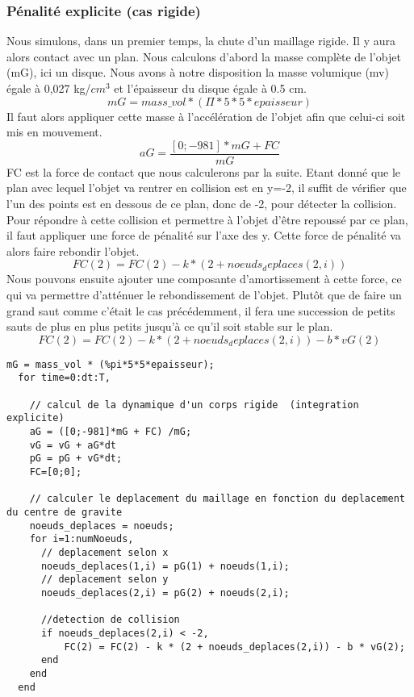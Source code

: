 \documentclass[a4paper,11pt]{article}
\begin{document}
\subsubsection{Pénalité explicite (cas rigide)}
Nous simulons, dans un premier temps, la chute d'un maillage rigide. Il y aura alors contact avec un plan.
Nous calculons d'abord la masse complète de l'objet (mG), ici un disque. Nous avons à notre disposition la 
masse volumique (mv) égale à 0,027 kg/$cm^3$ et l'épaisseur du disque égale à 0.5 cm.
\begin{equation}
  mG = mass\_vol * (\Pi*5*5*epaisseur)
\end{equation}
Il faut alors appliquer cette masse à l’accélération de l'objet afin que celui-ci soit mis en mouvement.
\begin{equation}
  aG = \frac{[0;-981]*mG + FC}{mG}
\end{equation}
FC est la force de contact que nous calculerons par la suite.
Etant donné que le plan avec lequel l'objet va rentrer en collision est en y=-2, il suffit de vérifier
que l'un des points est en dessous de ce plan, donc de -2, pour détecter la collision. Pour répondre à
cette collision et permettre à l'objet d'être repoussé par ce plan, il faut appliquer une force de pénalité
sur l'axe des y. Cette force de pénalité va alors faire rebondir l'objet.
\begin{equation}
  FC(2) = FC(2) - k * (2 + noeuds_deplaces(2,i))
\end{equation}
Nous pouvons ensuite ajouter une composante d'amortissement à cette force, ce qui va permettre d'atténuer
le rebondissement de l'objet. Plutôt que de faire un grand saut comme c'était le cas précédemment, il fera 
une succession de petits sauts de plus en plus petits jusqu'à ce qu'il soit stable sur le plan.
\begin{equation}
  FC(2) = FC(2) - k * (2 + noeuds_deplaces(2,i)) - b * vG(2)
\end{equation}
\begin{lstlisting}[caption=Calcul de la pénalité explicite]
  mG = mass_vol * (%pi*5*5*epaisseur);
  for time=0:dt:T,
  
    // calcul de la dynamique d'un corps rigide  (integration explicite)
    aG = ([0;-981]*mG + FC) /mG;   
    vG = vG + aG*dt
    pG = pG + vG*dt;
    FC=[0;0];
    
    // calculer le deplacement du maillage en fonction du deplacement du centre de gravite
    noeuds_deplaces = noeuds;
    for i=1:numNoeuds,
      // deplacement selon x
      noeuds_deplaces(1,i) = pG(1) + noeuds(1,i);
      // deplacement selon y
      noeuds_deplaces(2,i) = pG(2) + noeuds(2,i);  
      
      //detection de collision
      if noeuds_deplaces(2,i) < -2,
          FC(2) = FC(2) - k * (2 + noeuds_deplaces(2,i)) - b * vG(2);
      end
    end 
  end
\end{lstlisting}
\end{document}
